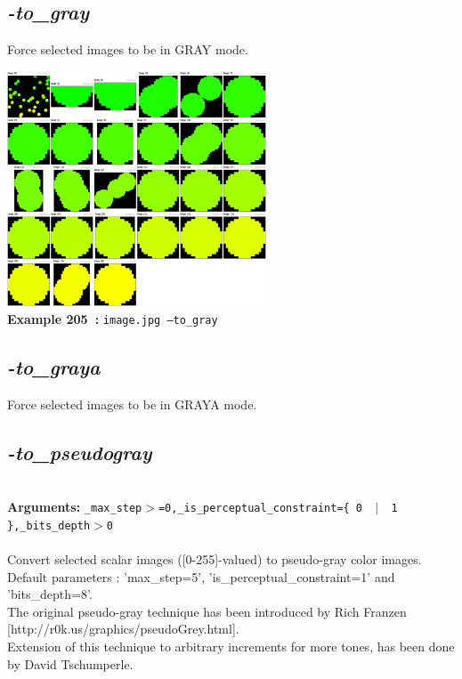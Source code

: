 \documentclass[a4paper,11pt,twoside]{book}
\begin{document}
\subsection{\emph{-to\_gray} }\vspace*{-0.5em}
Force selected images to be in GRAY mode.
\begin{center}\includegraphics[keepaspectratio=true,height=7cm,width=\textwidth]{img/gmic_def205.jpg}\\
{\footnotesize \textbf{Example 205~:} \texttt{image.jpg --to\_gray}}
\end{center}

\subsection{\emph{-to\_graya} }\vspace*{-0.5em}
Force selected images to be in GRAYA mode.


\subsection{\emph{-to\_pseudogray} }\vspace*{-0.5em}
~\\\textbf{Arguments: } 
{\small \texttt{\_max\_step$>$=0,\_is\_perceptual\_constraint=\{ 0 ~$|$~ 1 \},\_bits\_depth$>$0}}\\~\\
Convert selected scalar images ([0-255]-valued) to pseudo-gray color images.
~\\Default parameters : 'max\_step=5', 'is\_perceptual\_constraint=1' and 'bits\_depth=8'.
~\\The original pseudo-gray technique has been introduced by Rich Franzen [http://r0k.us/graphics/pseudoGrey.html].
~\\Extension of this technique to arbitrary increments for more tones, has been done by David Tschumperle.
\end{document}
